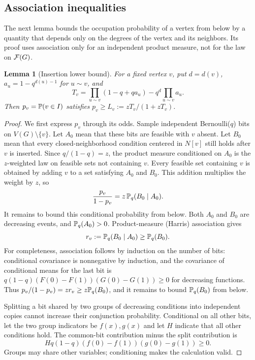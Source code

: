 \documentclass[11pt]{article}
\newtheorem{lemma}[theorem]{Lemma}
\begin{document}
\subsection{Association inequalities}\label{sec:association}
The next lemma bounds the occupation probability of a vertex from below by a quantity that depends only on the degrees of the vertex and its neighbors. Its proof uses association only for an independent product measure, not for the law on $\mathcal F(G)$.
\begin{lemma}[Insertion lower bound]\label{lem:association}
For a fixed vertex $v$, put $d=d(v)$, $a_u=1-q^{d(u)-1}$ for $u\sim v$, and
\[
 T_v=\prod_{u\sim v}(1-q+qa_u)-q^d\prod_{u\sim v}a_u.
\]
Then $p_v=\mathbb P(v\in I)$ satisfies $p_v\ge L_v:=zT_v/(1+zT_v)$.
\end{lemma}
\begin{proof}
We first express $p_v$ through its odds. Sample independent Bernoulli($q$) bits on $V(G)\setminus\{v\}$. Let $A_0$ mean that these bits are feasible with $v$ absent. Let $B_0$ mean that every closed-neighborhood condition centered in $N[v]$ still holds after $v$ is inserted. Since $q/(1-q)=z$, the product measure conditioned on $A_0$ is the $z$-weighted law on feasible sets not containing $v$. Every feasible set containing $v$ is obtained by adding $v$ to a set satisfying $A_0$ and $B_0$. This addition multiplies the weight by $z$, so
\[
 \frac{p_v}{1-p_v}=z\,\mathbb P_q(B_0\mid A_0).
\]
It remains to bound this conditional probability from below. Both $A_0$ and $B_0$ are decreasing events, and $\mathbb P_q(A_0)>0$. Product-measure (Harris) association gives
\[
 r_v:=\mathbb P_q(B_0\mid A_0)\ge\mathbb P_q(B_0).
\]
For completeness, association follows by induction on the number of bits: conditional covariance is nonnegative by induction, and the covariance of conditional means for the last bit is
$q(1-q)(F(0)-F(1))(G(0)-G(1))\ge0$
for decreasing functions. Thus $p_v/(1-p_v)=zr_v\ge z\mathbb P_q(B_0)$, and it remains to bound $\mathbb P_q(B_0)$ from below.

Splitting a bit shared by two groups of decreasing conditions into independent copies cannot increase their conjunction probability. Conditional on all other bits, let the two group indicators be $f(x),g(x)$ and let $H$ indicate that all other conditions hold. The common-bit contribution minus the split contribution is
\[
 Hq(1-q)(f(0)-f(1))(g(0)-g(1))\ge0.
\]
Groups may share other variables; conditioning makes the calculation valid.


\end{proof}
\end{document}
